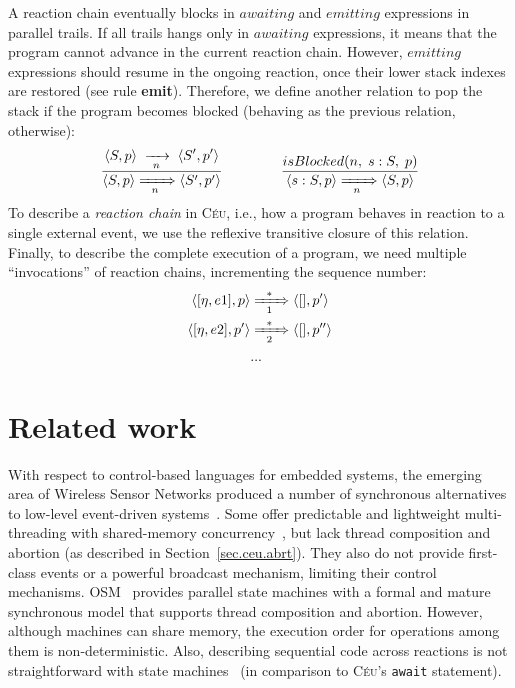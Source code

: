 \documentclass{acm_proc_article-sp}
\newcommand{\CEU}{\textsc{C\'{e}u}\xspace}
\newcommand{\code}[1] {{\small{\texttt{#1}}}}
\newcommand{\ST}{\1\xrightarrow[~n~]{}\1}
\newcommand{\LL}{\langle}
\newcommand{\RR}{\rangle}
\newcommand{\DS}{\displaystyle}
\newcommand{\rr}[1] {{\textbf{\scriptsize{#1}}}}
\newcommand{\1}{\;}
\newcommand{\2}{\;\;}
\newcommand{\3}{\;\;\;}
\newcommand{\5}{\;\;\;\;\;}
\begin{document}
A reaction chain eventually blocks in $awaiting$ and $emitting$ expressions in 
parallel trails.
%
If all trails hangs only in $awaiting$ expressions, it means that the program 
cannot advance in the current reaction chain.
%
However, $emitting$ expressions should resume in the ongoing reaction, once 
their lower stack indexes are restored (see rule \rr{emit}).
%
Therefore, we define another relation to pop the stack if the program becomes 
blocked (behaving as the previous relation, otherwise):
%
$$
\frac
    { \DS \LL S,p \RR \ST                   \LL S',p' \RR }
    {     \LL S,p \RR \xRightarrow[~~n~~]{} \LL S',p' \RR }
%
\5\5\5
%
\frac
    { \DS isBlocked(n,\1s:S,\1p) }
    { \LL s:S,p \RR \xRightarrow[~~n~~]{} \LL S,p \RR }
$$
%
To describe a \emph{reaction chain} in \CEU, i.e., how a program behaves in 
reaction to a single external event, we use the reflexive transitive closure of 
this relation.
%
Finally, to describe the complete execution of a program, we need multiple 
``invocations'' of reaction chains, incrementing the sequence number:
%
\begin{align*}
\LL [\eta,e1], p \RR
    & \xRightarrow[~~1~~]{*}
\LL [  ], p' \RR
\\
\LL [\eta,e2], p' \RR
    & \xRightarrow[~~2~~]{*}
\LL [  ], p'' \RR
\\
& ...
\end{align*}
%

\section{Related work}
\label{sec.related}

With respect to control-based languages for embedded systems, the emerging area 
of Wireless Sensor Networks produced a number of synchronous alternatives to 
low-level event-driven systems~\cite{wsn.protothreads,wsn.sol,wsn.osm}. 
%
Some offer predictable and lightweight
multi-threading with shared-memory concurrency~\cite{wsn.protothreads}, but 
lack thread composition and abortion (as described in 
Section~\ref{sec.ceu.abrt}).
They also do not provide first-class events or a powerful broadcast mechanism, 
limiting their control mechanisms.
%
OSM~\cite{wsn.osm} provides parallel state machines with a formal and mature 
synchronous model that supports thread composition and abortion.
However, although machines can share memory, the execution order for operations 
among them is non-deterministic.
Also, describing sequential code across reactions is not straightforward with 
state machines~\cite{wsn.osm} (in comparison to \CEU's \code{await} statement).
%
\end{document}
